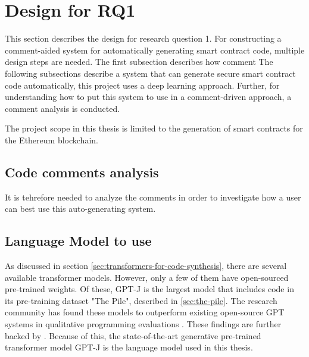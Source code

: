 \section{Design for RQ1}
\label{sec:design-for-rq1}
This section describes the design for research question 1. For constructing a comment-aided system for automatically generating smart contract code, multiple design steps are needed. The first subsection describes how comment The following subsections describe a system that can generate secure smart contract code automatically, this project uses a deep learning approach. Further, for understanding how to put this system to use in a comment-driven approach, a comment analysis is conducted.

The project scope in this thesis is limited to the generation of smart contracts for the Ethereum blockchain. 

\subsection{Code comments analysis}
\label{sec:code-comments-analysis}
It is tehrefore needed to analyze the comments in order to investigate how a user can best use this auto-generating system.

\subsection{Language Model to use}
\label{sec:language-model}
As discussed in section \cref{sec:transformers-for-code-synthesis}, there are several available transformer models. However, only a few of them have open-sourced pre-trained weights. Of these, GPT-J \cite{gpt-j} is the largest model that includes code in its pre-training dataset "The Pile", described in \cref{sec:the-pile}. The research community has found these models to outperform existing open-source GPT systems in qualitative programming evaluations \cite{wolf2021}. These findings are further backed by \cite{chen2021codex}. Because of this, the state-of-the-art generative pre-trained transformer model GPT-J is the language model used in this thesis.


